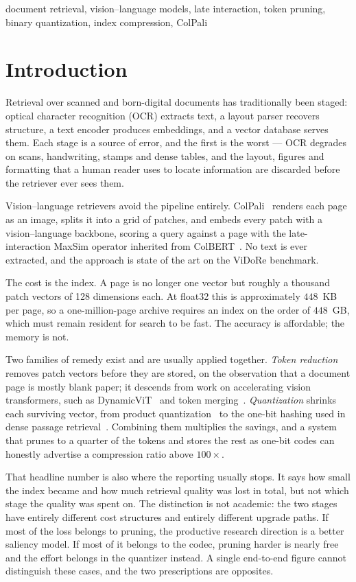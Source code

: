 \documentclass[conference]{IEEEtran}
\begin{document}
\begin{IEEEkeywords}
document retrieval, vision--language models, late interaction, token pruning,
binary quantization, index compression, ColPali
\end{IEEEkeywords}

\section{Introduction}

Retrieval over scanned and born-digital documents has traditionally been
staged: optical character recognition (OCR) extracts text, a layout parser
recovers structure, a text encoder produces embeddings, and a vector database
serves them. Each stage is a source of error, and the first is the worst --- OCR
degrades on scans, handwriting, stamps and dense tables, and the layout, figures
and formatting that a human reader uses to locate information are discarded
before the retriever ever sees them.

Vision--language retrievers avoid the pipeline entirely. ColPali~\cite{colpali}
renders each page as an image, splits it into a grid of patches, and embeds every
patch with a vision--language backbone, scoring a query against a page with the
late-interaction MaxSim operator inherited from ColBERT~\cite{colbert}. No text
is ever extracted, and the approach is state of the art on the ViDoRe benchmark.

The cost is the index. A page is no longer one vector but roughly a thousand
patch vectors of 128 dimensions each. At float32 this is approximately
$448$~KB per page, so a one-million-page archive requires an index on the order
of $448$~GB, which must remain resident for search to be fast. The accuracy is
affordable; the memory is not.

Two families of remedy exist and are usually applied together. \emph{Token
reduction} removes patch vectors before they are stored, on the observation that
a document page is mostly blank paper; it descends from work on accelerating
vision transformers, such as DynamicViT~\cite{dynamicvit} and token
merging~\cite{tome}. \emph{Quantization} shrinks each surviving vector, from
product quantization~\cite{pq} to the one-bit hashing used in dense passage
retrieval~\cite{binaryhash}. Combining them multiplies the savings, and a system
that prunes to a quarter of the tokens and stores the rest as one-bit codes can
honestly advertise a compression ratio above $100\times$.

That headline number is also where the reporting usually stops. It says how
small the index became and how much retrieval quality was lost in total, but not
which stage the quality was spent on. The distinction is not academic: the two
stages have entirely different cost structures and entirely different upgrade
paths. If most of the loss belongs to pruning, the productive research direction
is a better saliency model. If most of it belongs to the codec, pruning harder is
nearly free and the effort belongs in the quantizer instead. A single end-to-end
figure cannot distinguish these cases, and the two prescriptions are opposites.
\end{document}
